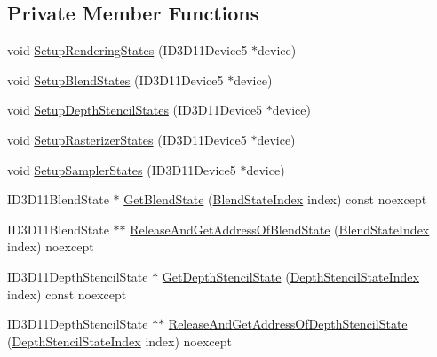 \subsection*{Private Member Functions}
\begin{DoxyCompactItemize}
\item 
void \hyperlink{classmage_1_1_rendering_state_manager_a552a7dcc8e932ebee1fc3256411cbd51}{Setup\+Rendering\+States} (I\+D3\+D11\+Device5 $\ast$device)
\item 
void \hyperlink{classmage_1_1_rendering_state_manager_a9c3df1b125b1348ef0a901bc196ab740}{Setup\+Blend\+States} (I\+D3\+D11\+Device5 $\ast$device)
\item 
void \hyperlink{classmage_1_1_rendering_state_manager_a69fd22d63b9019e1bc2ebd811d7e39a8}{Setup\+Depth\+Stencil\+States} (I\+D3\+D11\+Device5 $\ast$device)
\item 
void \hyperlink{classmage_1_1_rendering_state_manager_a74e37deb853254b87a0f61af178ad703}{Setup\+Rasterizer\+States} (I\+D3\+D11\+Device5 $\ast$device)
\item 
void \hyperlink{classmage_1_1_rendering_state_manager_ae567fc70128f8fa58b2ac0b63b0c636f}{Setup\+Sampler\+States} (I\+D3\+D11\+Device5 $\ast$device)
\item 
I\+D3\+D11\+Blend\+State $\ast$ \hyperlink{classmage_1_1_rendering_state_manager_a09dc8e15d98269b1b9c5f9bb71c647b4}{Get\+Blend\+State} (\hyperlink{classmage_1_1_rendering_state_manager_a499a47606ff73352331177b668c4b64c}{Blend\+State\+Index} index) const noexcept
\item 
I\+D3\+D11\+Blend\+State $\ast$$\ast$ \hyperlink{classmage_1_1_rendering_state_manager_ad7626daab9a488a34ab50df3768d5bc9}{Release\+And\+Get\+Address\+Of\+Blend\+State} (\hyperlink{classmage_1_1_rendering_state_manager_a499a47606ff73352331177b668c4b64c}{Blend\+State\+Index} index) noexcept
\item 
I\+D3\+D11\+Depth\+Stencil\+State $\ast$ \hyperlink{classmage_1_1_rendering_state_manager_aabd3a4bec099f0325c238bdfa43cbc88}{Get\+Depth\+Stencil\+State} (\hyperlink{classmage_1_1_rendering_state_manager_a7a8ab9ab2d4eb992a364d09c9eec636a}{Depth\+Stencil\+State\+Index} index) const noexcept
\item 
I\+D3\+D11\+Depth\+Stencil\+State $\ast$$\ast$ \hyperlink{classmage_1_1_rendering_state_manager_a2387df8ca417a4e743551e9a59af19de}{Release\+And\+Get\+Address\+Of\+Depth\+Stencil\+State} (\hyperlink{classmage_1_1_rendering_state_manager_a7a8ab9ab2d4eb992a364d09c9eec636a}{Depth\+Stencil\+State\+Index} index) noexcept
\item 

\end{DoxyCompactItemize}
